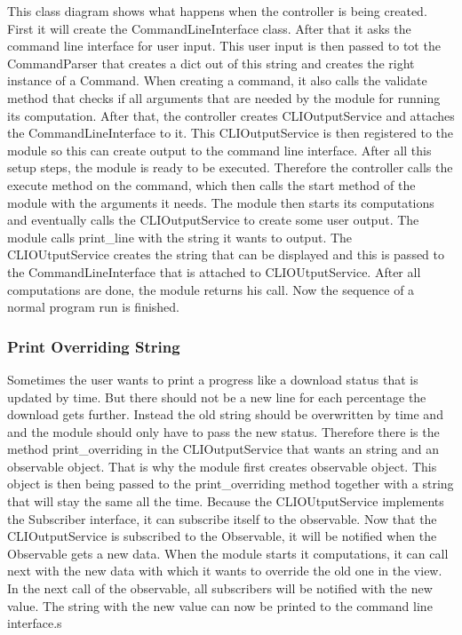 \documentclass[parskip=full]{scrartcl}
\begin{document}
This class diagram shows what happens when the controller is being created.
First it will create the CommandLineInterface class.
After that it asks the command line interface for user input.
This user input is then passed to tot the CommandParser that creates a dict out of this string and creates the right instance of a Command.
When creating a command, it also calls the validate method that checks if all arguments that are needed by the module for running its computation.
After that, the controller creates CLIOutputService and attaches the CommandLineInterface to it.
This CLIOutputService is then registered to the module so this can create output to the command line interface.
After all this setup steps, the module is ready to be executed.
Therefore the controller calls the execute method on the command, which then calls the start method of the module with the arguments it needs.
The module then starts its computations and eventually calls the CLIOutputService to create some user output.
The module calls print_line with the string it wants to output.
The CLIOUtputService creates the string that can be displayed and this is passed to the CommandLineInterface that is attached to CLIOUtputService.
After all computations are done, the module returns his call.
Now the sequence of a normal program run is finished.

\subsubsection{Print Overriding String}



Sometimes the user wants to print a progress like a download status that is updated by time.
But there should not be a new line for each percentage the download gets further.
Instead the old string should be overwritten by time and and the module should only have to pass the new status.
Therefore there is the method print_overriding in the CLIOutputService that wants an string and an observable object.
That is why the module first creates observable object.
This object is then being passed to the print_overriding method together with a string that will stay the same all the time.
Because the CLIOUtputService implements the Subscriber interface, it can subscribe itself to the observable.
Now that the CLIOutputService is subscribed to the Observable, it will be notified when the Observable gets a new data.
When the module starts it computations, it can call next with the new data with which it wants to override the old one in the view.
In the next call of the observable, all subscribers will be notified with the new value.
The string with the new value can now be printed to the command line interface.s
\end{document}
